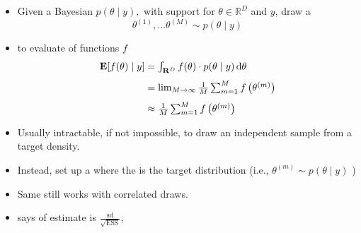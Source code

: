 \documentclass[10pt]{report}
\newcommand{\expect}[1]{\mathbb{E}\!\left[ #1 \right]}
\newcommand{\draw}[2]{#1^{(#2)}}
\begin{document}
\begin{itemize}
\item Given a Bayesian  $p(\theta \mid y),$
  with support for  $\theta \in \mathbb{R}^D$ and  $y$,
  draw a 
  $$ \textstyle
  \draw{\theta}{1}, \ldots \draw{\theta}{M} \sim p(\theta \mid y)
  $$
\item to evaluate  of functions $f$
\begin{align*}
  \textstyle 
  \expect{f(\theta) \mid y}
  &= \textstyle \int_{\mathbb{R}^D} f(\theta) \cdot p(\theta \mid y) \,
    \textrm{d}\theta
  \\[4pt]
  &= \textstyle \lim_{M \rightarrow \infty} \frac{1}{M} \sum_{m=1}^M 
f\left( \draw{\theta}{m} \right)
  \\[4pt] \textstyle
  &\approx \textstyle \frac{1}{M} \sum_{m=1}^M f\left(\draw{\theta}{m}\right) 
\end{align*}
\end{itemize}

\begin{itemize}
\item Usually intractable, if not impossible, to draw an independent sample from a target density.
\item Instead, set up a  where the 
  is the target distribution (i.e., $\theta^{(m)} \sim p(\theta \mid
  y)$ )
\item Same  still works with correlated draws.
\item {} says 
  of estimate is
  $\displaystyle \frac{\textrm{sd}}{\sqrt{\textrm{ESS}}}$,
  \vspace*{-12pt}
\end{itemize}
\end{document}
